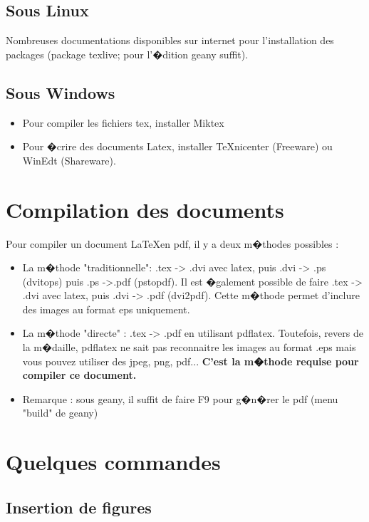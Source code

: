 \documentclass[11pt,oneside,noprintercorrection]{ustl}
\begin{document}
\subsection{Sous Linux}
Nombreuses documentations disponibles sur internet pour
l'installation des packages (package texlive; pour l'�dition geany suffit).

\subsection{Sous Windows}

\begin{itemize}
\item Pour compiler les fichiers tex, installer Miktex \cite{Mikex}
\item Pour �crire des documents Latex, installer TeXnicenter \cite{Texnicenter} (Freeware) ou WinEdt \cite{WinEdt} (Shareware).
\end{itemize}

\section{Compilation des documents}
Pour compiler un document \LaTeX en pdf, il y a deux m�thodes possibles :

\begin{itemize}
\item La m�thode "traditionnelle": .tex -> .dvi avec latex, puis .dvi -> .ps (dvitops) puis .ps ->.pdf (pstopdf). Il est
 �galement possible de faire .tex -> .dvi avec latex, puis .dvi -> .pdf
(dvi2pdf). Cette m�thode permet d'inclure des images au format eps
uniquement.
\item La m�thode "directe" : .tex -> .pdf en utilisant pdflatex. Toutefois, revers de la m�daille, pdflatex ne sait pas reconnaitre les images au format .eps mais vous pouvez
utiliser des jpeg, png, pdf... {\bf C'est la m�thode requise pour compiler ce document.}
\item Remarque : sous geany, il suffit de faire F9 pour g�n�rer le pdf (menu "build" de geany)
\end{itemize}

\section{Quelques commandes}
\subsection{Insertion de figures}
\end{document}
